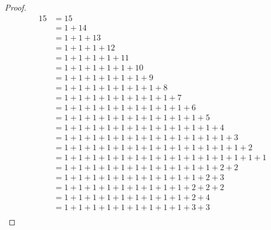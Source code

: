 \begin{proof}
    \begingroup
    \allowdisplaybreaks{}
    \begin{align*}
        15 & = 15                                                                  \\
           & = 1 + 14                                                              \\
           & = 1 + 1 + 13                                                          \\
           & = 1 + 1 + 1 + 12                                                      \\
           & = 1 + 1 + 1 + 1 + 11                                                  \\
           & = 1 + 1 + 1 + 1 + 1 + 10                                              \\
           & = 1 + 1 + 1 + 1 + 1 + 1 + 9                                           \\
           & = 1 + 1 + 1 + 1 + 1 + 1 + 1 + 8                                       \\
           & = 1 + 1 + 1 + 1 + 1 + 1 + 1 + 1 + 7                                   \\
           & = 1 + 1 + 1 + 1 + 1 + 1 + 1 + 1 + 1 + 6                               \\
           & = 1 + 1 + 1 + 1 + 1 + 1 + 1 + 1 + 1 + 1 + 5                           \\
           & = 1 + 1 + 1 + 1 + 1 + 1 + 1 + 1 + 1 + 1 + 1 + 4                       \\
           & = 1 + 1 + 1 + 1 + 1 + 1 + 1 + 1 + 1 + 1 + 1 + 1 + 3                   \\
           & = 1 + 1 + 1 + 1 + 1 + 1 + 1 + 1 + 1 + 1 + 1 + 1 + 1 + 2               \\
           & = 1 + 1 + 1 + 1 + 1 + 1 + 1 + 1 + 1 + 1 + 1 + 1 + 1 + 1 + 1           \\
           & = 1 + 1 + 1 + 1 + 1 + 1 + 1 + 1 + 1 + 1 + 1 + 2 + 2                   \\
           & = 1 + 1 + 1 + 1 + 1 + 1 + 1 + 1 + 1 + 1 + 2 + 3                       \\
           & = 1 + 1 + 1 + 1 + 1 + 1 + 1 + 1 + 1 + 2 + 2 + 2                       \\
           & = 1 + 1 + 1 + 1 + 1 + 1 + 1 + 1 + 1 + 2 + 4                           \\
           & = 1 + 1 + 1 + 1 + 1 + 1 + 1 + 1 + 1 + 3 + 3                           \\

\end{align*}
\end{proof}
